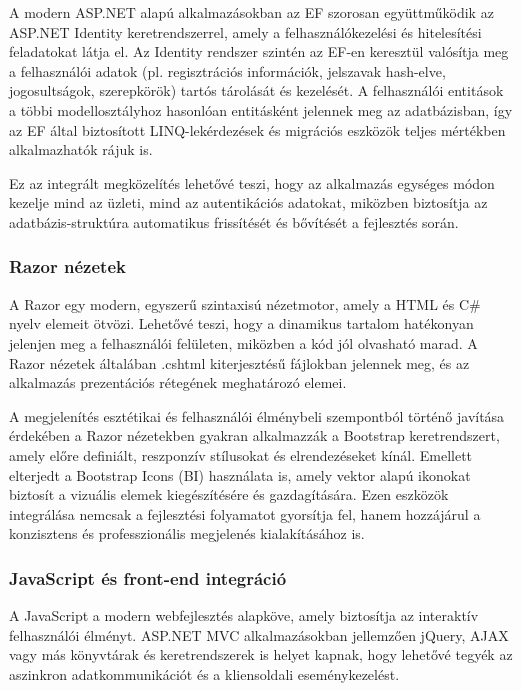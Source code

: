 A modern ASP.NET alapú alkalmazásokban az EF szorosan együttműködik az ASP.NET Identity keretrendszerrel, amely a felhasználókezelési és hitelesítési feladatokat látja el. Az Identity rendszer szintén az EF-en keresztül valósítja meg a felhasználói adatok (pl. regisztrációs információk, jelszavak hash-elve, jogosultságok, szerepkörök) tartós tárolását és kezelését. A felhasználói entitások a többi modellosztályhoz hasonlóan entitásként jelennek meg az adatbázisban, így az EF által biztosított LINQ-lekérdezések és migrációs eszközök teljes mértékben alkalmazhatók rájuk is.

Ez az integrált megközelítés lehetővé teszi, hogy az alkalmazás egységes módon kezelje mind az üzleti, mind az autentikációs adatokat, miközben biztosítja az adatbázis-struktúra automatikus frissítését és bővítését a fejlesztés során.

\subsubsection{Razor nézetek}

\indent A Razor egy modern, egyszerű szintaxisú nézetmotor, amely a HTML és C\# nyelv elemeit ötvözi. Lehetővé teszi, hogy a dinamikus tartalom hatékonyan jelenjen meg a felhasználói felületen, miközben a kód jól olvasható marad. A Razor nézetek általában {.cshtml} kiterjesztésű fájlokban jelennek meg, és az alkalmazás prezentációs rétegének meghatározó elemei.

\indent A megjelenítés esztétikai és felhasználói élménybeli szempontból történő javítása érdekében a Razor nézetekben gyakran alkalmazzák a Bootstrap keretrendszert, amely előre definiált, reszponzív stílusokat és elrendezéseket kínál. Emellett elterjedt a Bootstrap Icons (BI) használata is, amely vektor alapú ikonokat biztosít a vizuális elemek kiegészítésére és gazdagítására. Ezen eszközök integrálása nemcsak a fejlesztési folyamatot gyorsítja fel, hanem hozzájárul a konzisztens és professzionális megjelenés kialakításához is.



\subsubsection{JavaScript és front-end integráció}

\indent A JavaScript a modern webfejlesztés alapköve, amely biztosítja az interaktív felhasználói élményt. ASP.NET MVC alkalmazásokban jellemzően jQuery, AJAX vagy más könyvtárak és keretrendszerek is helyet kapnak, hogy lehetővé tegyék az aszinkron adatkommunikációt és a kliensoldali eseménykezelést.


